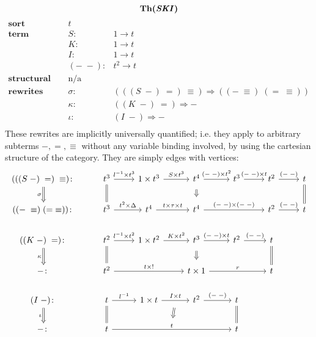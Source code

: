 \documentclass{amsart}
\theoremstyle{definition}
\newcommand{\maps}{\colon}
\begin{document}
$$\textbf{Th(\textit{SKI})}$$
\[\begin{array}{rcl}
\textbf{sort} & t &\\
\textbf{term constructors} & S\maps & 1 \to t\\
& K\maps & 1 \to t\\
& I\maps & 1 \to t\\
& (-\; -)\maps &  t^2 \to t\\
\textbf{structural congruence} & \text{n/a} &\\
\textbf{rewrites} & \sigma\maps & (((S\; -)\; =)\; \equiv) \Rightarrow ((-\; \equiv)\; (=\; \equiv))\\
& \kappa\maps & ((K\; -)\; =) \Rightarrow -\\
& \iota\maps & (I\; -) \Rightarrow -\\
\end{array}\]
These rewrites are implicitly universally quantified; i.e. they apply to arbitrary subterms $-, =, \equiv$ without any variable binding involved, by using the cartesian structure of the category. They are simply edges with vertices:
\[\begin{tikzcd}
(((S\; -)\; =)\; \equiv)\maps \arrow[Rightarrow,d,swap,"\sigma"] & t^3 \arrow[d,equal] \arrow[r,"l^{-1} \times t^3"] & 1\times t^3 \arrow[r,"S \times t^3"] & t^4 \arrow[Rightarrow,d,shorten >=0.2cm,shorten <=0.2cm] \arrow[r,"(-\;-)\times t^2"] & t^3 \arrow[r,"(-\;-) \times t"] & t^2 \arrow[r,"(-\;-)"] & t\arrow[d,equal]\\
((-\; \equiv)\; (=\; \equiv))\maps & t^3 \arrow[r,"t^2 \times \Delta"] & t^4 \arrow[r,"t \times \tau \times t"]& t^4 \arrow[rr,"(-\;-) \times (-\;-)"]&& t^2 \arrow[r,"(-\;-)"]& t\\
((K\; -)\; =)\maps \arrow[Rightarrow,d,swap,"\kappa"] & t^2 \arrow[d,equal] \arrow[r,"l^{-1} \times t^2"] & 1\times t^2 \arrow[r,"K \times t^2"] & t^3 \arrow[Rightarrow,d,shorten >=0.2cm,shorten <=0.2cm] \arrow[r,"(-\;-)\times t"] & t^2 \arrow[r,"(-\;-)"] & t \arrow[d,equal]\\
-\maps & t^2 \arrow[rr,"t \times !"] && t \times 1 \arrow[rr,"r"] && t\\
(I\; -)\maps \arrow[Rightarrow,d,swap,"\iota"] & t \arrow[d,equal] \arrow[r,"l^{-1}"] & 1\times t \arrow[r,"I \times t",""name=1] & t^2 \arrow[r,"(-\;-)"] & t \arrow[d,equal]\\
-\maps & t \arrow[rrr,"t",""name=2] \arrow[Rightarrow,from=1,to=2,shorten >=0.3cm,shorten <=0.3cm] &&& t
\end{tikzcd}\]
\end{document}
